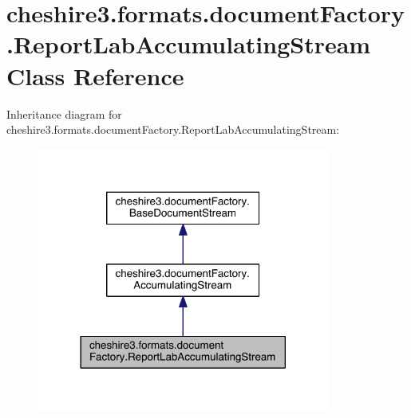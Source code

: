 \hypertarget{classcheshire3_1_1formats_1_1document_factory_1_1_report_lab_accumulating_stream}{\section{cheshire3.\-formats.\-document\-Factory.\-Report\-Lab\-Accumulating\-Stream Class Reference}
\label{classcheshire3_1_1formats_1_1document_factory_1_1_report_lab_accumulating_stream}
}


Inheritance diagram for cheshire3.\-formats.\-document\-Factory.\-Report\-Lab\-Accumulating\-Stream\-:
\nopagebreak
\begin{figure}[H]
\begin{center}
\leavevmode
\includegraphics[width=272pt]{classcheshire3_1_1formats_1_1document_factory_1_1_report_lab_accumulating_stream__inherit__graph}
\end{center}
\end{figure}


